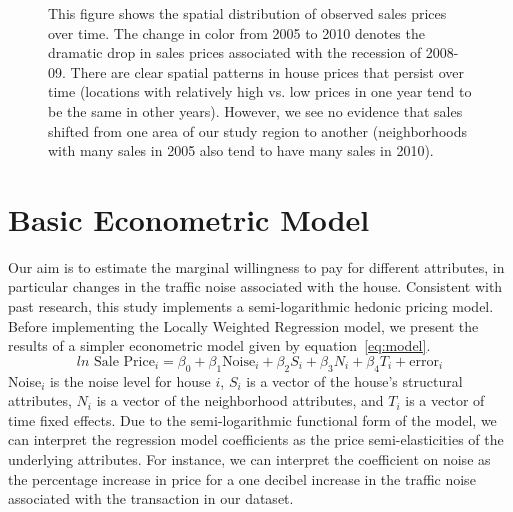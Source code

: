 \documentclass{article}\usepackage{graphicx, color}
\begin{document}
\begin{figure}
\caption{This figure shows the spatial distribution of observed sales prices over time. The change in color from 2005 to 2010 denotes the dramatic drop in sales prices associated with the recession of 2008-09. There are clear spatial patterns in  house prices that persist over time (locations with relatively high vs. low prices in one year tend to be the same in other years). However, we see no evidence that sales shifted from one area of our study region to another (neighborhoods with many sales in 2005 also tend to have many sales in 2010). }
\label{fig:SalesYear}
\end{figure}

\section{Basic Econometric Model}\label{basicModel}
Our aim is to estimate the marginal willingness to pay for different attributes, in particular changes in the traffic noise associated with the house. Consistent with past research, this study implements a semi-logarithmic hedonic pricing model.  Before implementing the Locally Weighted Regression model, we present the results of a simpler econometric model given by equation~\eqref{eq:model}.
\begin{equation}\label{eq:model}	
ln \textrm{ Sale Price}_i = \beta _0 + \beta _1 \textrm{Noise}_i+ \beta _2 S_i+ \beta _3 N_i + \beta _4 T_i + \textrm{error}_i
\end{equation}
Noise$_i$ is the noise level for house $i$, $S_i$ is a vector of the house's structural attributes, $N_i$ is a vector of the neighborhood attributes, and $T_i$ is a vector of time fixed effects. Due to the semi-logarithmic functional form of the model, we can interpret the regression model coefficients as the price semi-elasticities of the underlying attributes. For instance, we can interpret the coefficient on noise as the percentage increase in price for a one decibel increase in the traffic noise associated with the transaction in our dataset. 
\end{document}
